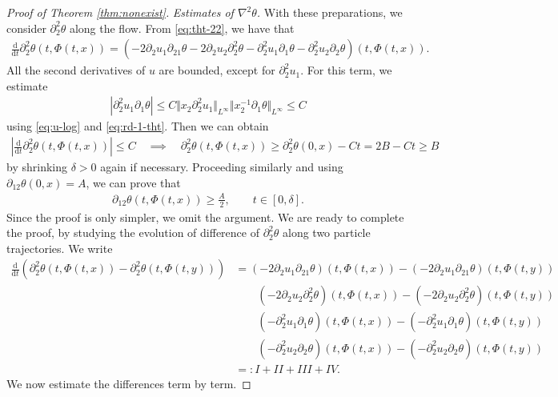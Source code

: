 \documentclass[10pt]{amsart}
\theoremstyle{definition}
\theoremstyle{remark}
\numberwithin{equation}{section}
\newcommand{\nrm}[1]{\Vert#1\Vert}
\newcommand{\ud}{\mathrm{d}}
\newcommand{\rd}{\partial}
\newcommand{\nb}{\nabla}
\newcommand{\0}{\emptyset}
\newcommand{\dlt}{\delta}
\newcommand{\tht}{\theta}
\begin{document}
\begin{proof}[Proof of Theorem \ref{thm:nonexist}]
			\noindent \textit{Estimates of $\nb^2\tht$.} With these preparations, we   consider  $\rd_{2}^{2}\tht$ along the flow. From \eqref{eq:tht-22}, we have that \begin{equation*}
				\begin{split}
					\frac{\ud}{\ud t} \partial_2^2 \theta(t,\Phi(t,x)) = \left( - 2\rd_2 u_1 \rd_{21}\tht - 2\rd_{2}u_{2} \rd_{2}^{2}\tht - {\rd_{2}^{2} u_1 }\rd_1\tht - \rd_{2}^{2}u_2\rd_2\tht \right) (t,\Phi(t,x)) .
				\end{split}
			\end{equation*} All the second derivatives of $u$ are bounded, except for $\rd_2^2 u_1$. For this term, we estimate \begin{equation*}
				\begin{split}
					\left| {\rd_{2}^{2} u_1 }\rd_1\tht  \right| \le C \nrm{ x_{2}  \rd_{2}^{2} u_1 }_{L^\infty} \nrm{x_{2}^{-1}\rd_1\tht }_{L^\infty} \le C
				\end{split}
			\end{equation*} using \eqref{eq:u-log} and \eqref{eq:rd-1-tht}. Then we can obtain \begin{equation}\label{eq:rd-2-2-tht}
				\begin{split}
					\left| 	\frac{\ud}{\ud t} \partial_2^2 \theta(t,\Phi(t,x)) \right| \le C \quad \implies \quad \rd_2^2\tht(t,\Phi(t,x)) \ge \rd_2^2\tht(0,x) - Ct = 2B - Ct \ge B
				\end{split}
			\end{equation} by shrinking $\dlt>0$ again if necessary. Proceeding similarly and using $\rd_{12}\tht(0,x) = A$, we can prove that \begin{equation}\label{eq:rd-1-2-tht}
				\begin{split}
					\rd_{12}\tht(t,\Phi(t,x)) \ge \frac{A}{2}, \qquad t \in [0,\dlt]. 
				\end{split}
			\end{equation} Since the proof is only simpler, we omit the argument. 
			We are ready to complete the proof, by studying the evolution of difference of $\rd_{2}^{2}\tht$ along two particle trajectories. We write 
			\begin{equation*}
				\begin{split}
					\frac{\ud}{\ud t} \left( \partial_2^2 \theta(t,\Phi(t,x)) - \partial_2^2 \theta(t,\Phi(t,y)) \right) & = (- 2\rd_2 u_1 \rd_{21}\tht )(t,\Phi(t,x)) - (- 2\rd_2 u_1 \rd_{21}\tht )(t,\Phi(t,y)) \\
					& \qquad ( - 2\rd_{2}u_{2} \rd_{2}^{2}\tht)(t,\Phi(t,x)) - ( - 2\rd_{2}u_{2} \rd_{2}^{2}\tht)(t,\Phi(t,y)) \\
					&\qquad ( - \rd_{2}^{2} u_1 \rd_1\tht )(t,\Phi(t,x)) - ( - \rd_{2}^{2} u_1 \rd_1\tht )(t,\Phi(t,y)) \\
					&\qquad ( - \rd_{2}^{2}u_2\rd_2\tht )(t,\Phi(t,x)) - ( - \rd_{2}^{2}u_2\rd_2\tht )(t,\Phi(t,y)) \\
					& =: I + II + III + IV . 
				\end{split}
			\end{equation*}
			We now estimate the differences term by term. 
			

\end{proof}
\end{document}
